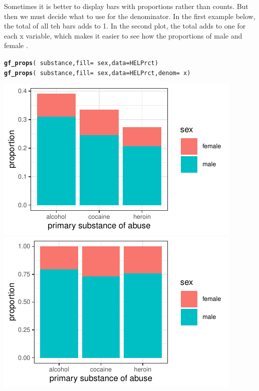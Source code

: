 \documentclass[twoside]{book}\usepackage[]{graphicx}\usepackage[]{xcolor}
\makeatletter
\def\maxwidth{ %
  \ifdim\Gin@nat@width>\linewidth
    \linewidth
  \else
    \Gin@nat@width
  \fi
}
\newcommand{\hlopt}[1]{\textcolor[rgb]{0,0,0}{#1}}%
\newcommand{\hlstd}[1]{\textcolor[rgb]{0.345,0.345,0.345}{#1}}%
\newcommand{\hlkwc}[1]{\textcolor[rgb]{0.333,0.667,0.333}{#1}}%
\newcommand{\hlkwd}[1]{\textcolor[rgb]{0.737,0.353,0.396}{\textbf{#1}}}%
\newenvironment{kframe}{%
 \def\at@end@of@kframe{}%
 \ifinner\ifhmode%
  \def\at@end@of@kframe{\end{minipage}}%
  \begin{minipage}{\columnwidth}%
 \fi\fi%
 \def\FrameCommand##1{\hskip\@totalleftmargin \hskip-\fboxsep
 \colorbox{shadecolor}{##1}\hskip-\fboxsep
     \hskip-\linewidth \hskip-\@totalleftmargin \hskip\columnwidth}%
 \MakeFramed {\advance\hsize-\width
   \@totalleftmargin\z@ \linewidth\hsize
   \@setminipage}}%
 {\par\unskip\endMakeFramed%
 \at@end@of@kframe}
\newenvironment{knitrout}{}{} %
\newcounter{example}[section]
\makeatother
\begin{document}
Sometimes it is better to display bars with proportions rather than counts. But then we must decide
what to use for the denominator.
In the first example below, the total of all teh bars adds to 1. In the second plot, the total
adds to one for each x variable, which makes it easier to see how the proportions of male and female
.

\begin{knitrout}
\color{fgcolor}\begin{kframe}
\begin{alltt}
\hlkwd{gf_props}\hlstd{(}\hlopt{~}\hlstd{substance,} \hlkwc{fill} \hlstd{=} \hlopt{~}\hlstd{sex,} \hlkwc{data} \hlstd{= HELPrct)}
\hlkwd{gf_props}\hlstd{(}\hlopt{~}\hlstd{substance,} \hlkwc{fill} \hlstd{=} \hlopt{~}\hlstd{sex,} \hlkwc{data} \hlstd{= HELPrct,} \hlkwc{denom} \hlstd{=} \hlopt{~} \hlstd{x)}
\end{alltt}
\end{kframe}

{\centering \includegraphics[width=\maxwidth]{figures/fig-gf-props-1} 
\includegraphics[width=\maxwidth]{figures/fig-gf-props-2} 

}



\end{knitrout}
\end{document}
